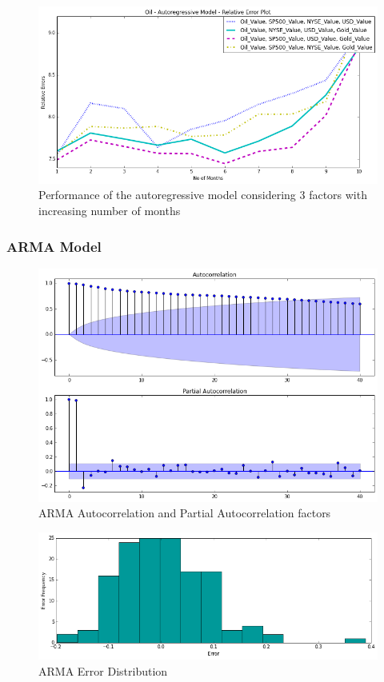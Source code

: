 \documentclass[runningheads]{llncs}
\begin{document}
\begin{figure}
\centering
\includegraphics[width=\textwidth]{oil_autoregressive_3factors_10.png}
\caption{Performance of the autoregressive model considering 3 factors with increasing number of months}
\label{fig:oil_autoregressive_3factors_10.png}
\end{figure}

\newpage
\subsubsection {ARMA Model}

\begin{center}
\begin{figure}
\centering
\includegraphics[width=\textwidth]{arma_autocorrelation.png}
\caption{ARMA Autocorrelation and Partial Autocorrelation factors}
\label{fig:arma_autocorrelation.png}
\end{figure}
\end{center}

\begin{figure}
\centering
\includegraphics[width=\textwidth]{arma_error_histogram.png}
\caption{ARMA Error Distribution}
\label{fig:arma_error_histogram.png}
\end{figure}
\end{document}
